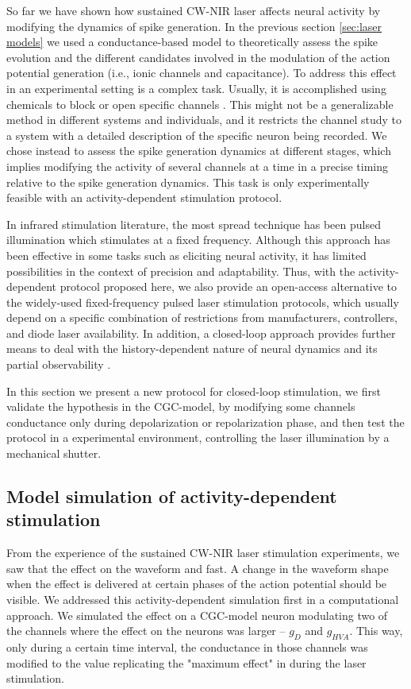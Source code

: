 So far we have shown how sustained CW-NIR laser affects neural activity by modifying the dynamics of spike generation. In the previous section \ref{sec:laser models} we used a conductance-based model to theoretically assess the spike evolution and the different candidates involved in the modulation of the action potential generation (i.e., ionic channels and capacitance). To address this effect in an experimental setting is a complex task. Usually, it is accomplished using chemicals to block or open specific channels \parencite{liang_temperaturedependent_2009}. This might not be a generalizable method in different systems and individuals, and it restricts the channel study to a system with a detailed description of the specific neuron being recorded. We chose instead to assess the spike generation dynamics at different stages, which implies modifying the activity of several channels at a time in a precise timing relative to the spike generation dynamics. This task is only experimentally feasible with an activity-dependent stimulation protocol.

In infrared stimulation literature, the most spread technique has been pulsed illumination which stimulates at a fixed frequency. Although this approach has been effective in some tasks such as eliciting neural activity, it has limited possibilities in the context of precision and adaptability. Thus, with the activity-dependent protocol proposed here, we also provide an open-access alternative to the widely-used fixed-frequency pulsed laser stimulation protocols, which usually depend on a specific combination of restrictions from manufacturers, controllers, and diode laser availability. In addition, a closed-loop approach provides further means to deal with the history-dependent nature of neural dynamics and its partial observability \parencite{varona_online_2016}. 

In this section we present a new protocol for closed-loop stimulation, we first validate the hypothesis in the CGC-model, by modifying some channels conductance only during depolarization or repolarization phase, and then test the protocol in a experimental environment, controlling the laser illumination by a mechanical shutter. 


\subsection{Model simulation of activity-dependent stimulation}

From the experience of the sustained CW-NIR laser stimulation experiments, we saw that the effect on the waveform and fast. A change in the waveform shape when the effect is delivered at certain phases of the action potential should be visible. We addressed this activity-dependent simulation first in a computational approach. We simulated the effect on a CGC-model neuron modulating two of the channels where the effect on the neurons was larger -- $g_D$ and $g_{HVA}$. This way, only during a certain time interval, the conductance in those channels was modified to the value replicating the "maximum effect" in during the laser stimulation. 

